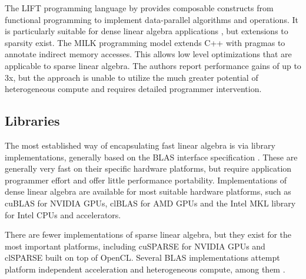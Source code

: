    The LIFT programming language by \citet{Steuwer:2015:GPP:2858949.2784754}
    provides composable constructs from functional programming to implement
    data-parallel algorithms and operations.
    It is particularly suitable for dense linear algebra applications
    \citep{Steuwer:2016:MMB:2968455.2968521}, but extensions to sparsity exist.
    The MILK programming model \citep{Kiriansky:2016:OIM:2967938.2967948}
    extends C++ with pragmas to annotate indirect memory accesses.
    This allows low level optimizations that are applicable to sparse linear
    algebra.
    The authors report performance gains of up to 3x, but the approach is unable
    to utilize the much greater potential of heterogeneous compute and requires
    detailed programmer intervention.

\subsection{Libraries}

    The most established way of encapsulating fast linear algebra is via
    library implementations, generally based on the BLAS interface
    specification \cite{2002:USB:567806.567807}.
    These are generally very fast on their specific hardware platforms, but
    require application programmer effort and offer little performance portability.
    Implementations of dense linear algebra are available for most suitable
    hardware platforms, such as cuBLAS \cite{cublas} for NVIDIA GPUs, clBLAS
    \cite{clblas} for AMD GPUs and the Intel MKL library \cite{mkl} for Intel
    CPUs and accelerators.

    There are fewer implementations of sparse linear algebra, but they exist for
    the most important platforms, including cuSPARSE \cite{cusparse} for NVIDIA
    GPUs and clSPARSE \cite{clsparse} built on top of OpenCL.
    Several BLAS implementations attempt platform independent acceleration and
    heterogeneous compute, among them \citet{Wang:2016:BHP:2925426.2926256,
    10.1007/978-3-319-64203-1_33, Diego2017Multi}. 


